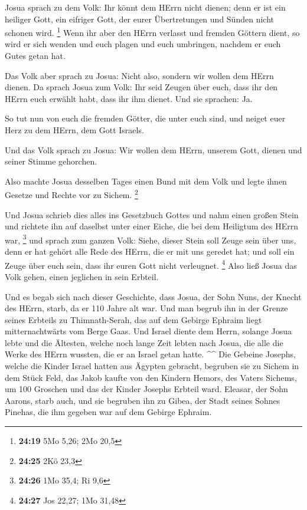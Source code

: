  Josua sprach zu dem Volk: Ihr könnt dem HErrn nicht
dienen; denn er ist ein heiliger Gott, ein eifriger Gott, der eurer
Übertretungen und Sünden nicht schonen wird. \footnote{\textbf{24:19}
  5Mo 5,26; 2Mo 20,5}  Wenn ihr aber den HErrn verlasst und
fremden Göttern dient, so wird er sich wenden und euch plagen und euch
umbringen, nachdem er euch Gutes getan hat.

 Das Volk aber sprach zu Josua: Nicht also, sondern wir
wollen dem HErrn dienen.  Da sprach Josua zum Volk: Ihr
seid Zeugen über euch, dass ihr den HErrn euch erwählt habt, dass ihr
ihm dienet. Und sie sprachen: Ja.

 So tut nun von euch die fremden Götter, die unter euch
sind, und neiget euer Herz zu dem HErrn, dem Gott Israels.

 Und das Volk sprach zu Josua: Wir wollen dem HErrn,
unserem Gott, dienen und seiner Stimme gehorchen.

 Also machte Josua desselben Tages einen Bund mit dem Volk
und legte ihnen Gesetze und Rechte vor zu Sichem. \footnote{\textbf{24:25}
  2Kö 23,3}

 Und Josua schrieb dies alles ins Gesetzbuch Gottes und
nahm einen großen Stein und richtete ihn auf daselbst unter einer Eiche,
die bei dem Heiligtum des HErrn war, \footnote{\textbf{24:26} 1Mo 35,4;
  Ri 9,6}  und sprach zum ganzen Volk: Siehe, dieser Stein
soll Zeuge sein über uns, denn er hat gehört alle Rede des HErrn, die er
mit uns geredet hat; und soll ein Zeuge über euch sein, dass ihr euren
Gott nicht verleugnet. \footnote{\textbf{24:27} Jos 22,27; 1Mo 31,48}
 Also ließ Josua das Volk gehen, einen jeglichen in sein
Erbteil.

 Und es begab sich nach dieser Geschichte, dass Josua, der
Sohn Nuns, der Knecht des HErrn, starb, da er 110 Jahre alt war.
 Und man begrub ihn in der Grenze seines Erbteils zu
Thimnath-Serah, das auf dem Gebirge Ephraim liegt mitternachtwärts vom
Berge Gaas.  Und Israel diente dem Herrn, solange Josua
lebte und die Ältesten, welche noch lange Zeit lebten nach Josua, die
alle die Werke des HErrn wussten, die er an Israel getan hatte. \^{}\^{}
 Die Gebeine Josephs, welche die Kinder Israel hatten aus
Ägypten gebracht, begruben sie zu Sichem in dem Stück Feld, das Jakob
kaufte von den Kindern Hemors, des Vaters Sichems, um 100 Groschen und
das der Kinder Josephs Erbteil ward.  Eleasar, der Sohn
Aarons, starb auch, und sie begruben ihn zu Gibea, der Stadt seines
Sohnes Pinehas, die ihm gegeben war auf dem Gebirge Ephraim.
